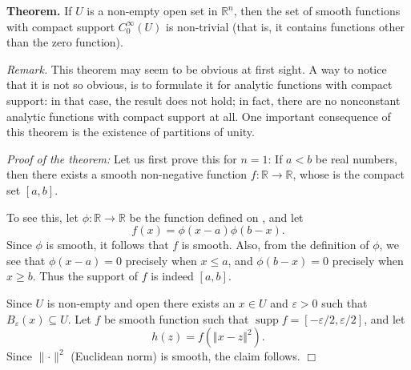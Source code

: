 \documentclass[12pt]{article}
\newcommand{\sR}[0]{\mathbb{R}}
\begin{document}

{\bf Theorem.} If $U$ is a non-empty open set in $\sR^n$, then the set of
smooth functions with compact support $C^\infty_0(U)$ is non-trivial (that is, it contains functions other than the zero function). 

\emph{Remark.} This theorem may seem to be obvious at first sight. 
A way to notice that it is not so obvious, is to formulate it for
analytic functions with compact support: in that case, the result
does not hold; in fact, there are no nonconstant analytic
functions with compact support at all. 
One important consequence of this theorem is the existence of partitions
of unity.

\emph{Proof of the theorem:}
Let us first prove this for $n=1$:
If $a<b$ be real numbers, then there exists a 
smooth non-negative function $f:\sR \to \sR$, whose  is the 
compact set $[a,b]$. 

To see this, let $\phi\colon \sR \to \sR$ be the function
 defined on ,
and let
$$ 
  f(x) = \phi(x-a) \phi(b-x).
$$
Since $\phi$ is smooth, it follows that $f$ is smooth. Also, from the
definition of $\phi$, we see that
$\phi(x-a)=0$ precisely when $x\le a$, and 
$\phi(b-x)=0$ precisely when $x\ge b$. 
Thus the support of $f$ is indeed $[a,b]$. 

Since $U$ is non-empty and
open there exists an $x\in U$ and $\varepsilon>0$ such that
$B_\varepsilon(x)\subseteq U$. Let $f$ be smooth function
such that $\operatorname{supp} f =[-\varepsilon/2,\varepsilon/2]$, and
let
$$
 h(z) = f(\Vert x-z \Vert^2).
$$
Since $\lVert\cdot \rVert^2$ (Euclidean norm) is smooth, the claim follows. 
$\Box$
\end{document}
